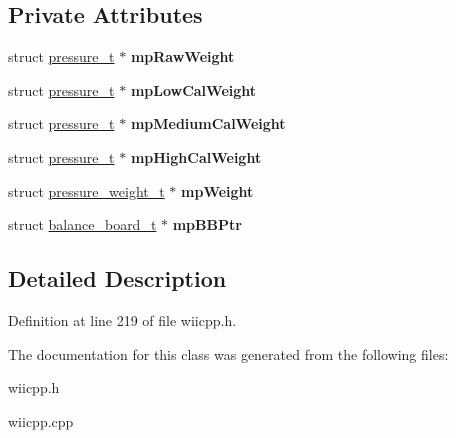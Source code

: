 \subsection*{\-Private \-Attributes}
\begin{DoxyCompactItemize}
\item 
\hypertarget{class_c_weight_sensor_ac8f520d14bebfce33404426e49a85098}{struct \hyperlink{structpressure__t}{pressure\-\_\-t} $\ast$ {\bfseries mp\-Raw\-Weight}}\label{class_c_weight_sensor_ac8f520d14bebfce33404426e49a85098}

\item 
\hypertarget{class_c_weight_sensor_a4a9a65f56da69d95fe60df5f73da16e8}{struct \hyperlink{structpressure__t}{pressure\-\_\-t} $\ast$ {\bfseries mp\-Low\-Cal\-Weight}}\label{class_c_weight_sensor_a4a9a65f56da69d95fe60df5f73da16e8}

\item 
\hypertarget{class_c_weight_sensor_a6f50ebe8c70c6feba0091bd205b2f8a6}{struct \hyperlink{structpressure__t}{pressure\-\_\-t} $\ast$ {\bfseries mp\-Medium\-Cal\-Weight}}\label{class_c_weight_sensor_a6f50ebe8c70c6feba0091bd205b2f8a6}

\item 
\hypertarget{class_c_weight_sensor_a13c39833afcf36fb3f7235a627523ff3}{struct \hyperlink{structpressure__t}{pressure\-\_\-t} $\ast$ {\bfseries mp\-High\-Cal\-Weight}}\label{class_c_weight_sensor_a13c39833afcf36fb3f7235a627523ff3}

\item 
\hypertarget{class_c_weight_sensor_a5ee5952ce915cf92efe5420bc201dd95}{struct \hyperlink{structpressure__weight__t}{pressure\-\_\-weight\-\_\-t} $\ast$ {\bfseries mp\-Weight}}\label{class_c_weight_sensor_a5ee5952ce915cf92efe5420bc201dd95}

\item 
\hypertarget{class_c_weight_sensor_a63d172119639b3385f432f86872cc926}{struct \hyperlink{structbalance__board__t}{balance\-\_\-board\-\_\-t} $\ast$ {\bfseries mp\-B\-B\-Ptr}}\label{class_c_weight_sensor_a63d172119639b3385f432f86872cc926}

\end{DoxyCompactItemize}


\subsection{\-Detailed \-Description}


\-Definition at line 219 of file wiicpp.\-h.



\-The documentation for this class was generated from the following files\-:\begin{DoxyCompactItemize}
\item 
wiicpp.\-h\item 
wiicpp.\-cpp\end{DoxyCompactItemize}
